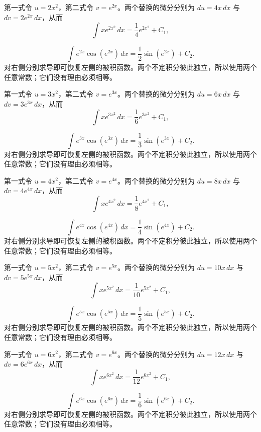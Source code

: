 \documentclass[UTF8,12pt,a4paper,fontset=fandol]{ctexart}
\begin{document}
\begin{solve}\label{ans:c12q14}
第一式令 $u=2x^2$，第二式令 $v=e^{2x}$。两个替换的微分分别为 $du=4x\,dx$ 与 $dv=2e^{2x}\,dx$，从而
\[
\int xe^{2x^2}\,dx=\frac{1}{4}e^{2x^2}+C_1,
\]

\[
\int e^{2x}\cos(e^{2x})\,dx=\frac{1}{2}\sin(e^{2x})+C_2.
\]
对右侧分别求导即可恢复左侧的被积函数。两个不定积分彼此独立，所以使用两个任意常数；它们没有理由必须相等。
\end{solve}

\begin{solve}\label{ans:c12q15}
第一式令 $u=3x^2$，第二式令 $v=e^{3x}$。两个替换的微分分别为 $du=6x\,dx$ 与 $dv=3e^{3x}\,dx$，从而
\[
\int xe^{3x^2}\,dx=\frac{1}{6}e^{3x^2}+C_1,
\]

\[
\int e^{3x}\cos(e^{3x})\,dx=\frac{1}{3}\sin(e^{3x})+C_2.
\]
对右侧分别求导即可恢复左侧的被积函数。两个不定积分彼此独立，所以使用两个任意常数；它们没有理由必须相等。
\end{solve}

\begin{solve}\label{ans:c12q16}
第一式令 $u=4x^2$，第二式令 $v=e^{4x}$。两个替换的微分分别为 $du=8x\,dx$ 与 $dv=4e^{4x}\,dx$，从而
\[
\int xe^{4x^2}\,dx=\frac{1}{8}e^{4x^2}+C_1,
\]

\[
\int e^{4x}\cos(e^{4x})\,dx=\frac{1}{4}\sin(e^{4x})+C_2.
\]
对右侧分别求导即可恢复左侧的被积函数。两个不定积分彼此独立，所以使用两个任意常数；它们没有理由必须相等。
\end{solve}

\begin{solve}\label{ans:c12q17}
第一式令 $u=5x^2$，第二式令 $v=e^{5x}$。两个替换的微分分别为 $du=10x\,dx$ 与 $dv=5e^{5x}\,dx$，从而
\[
\int xe^{5x^2}\,dx=\frac{1}{10}e^{5x^2}+C_1,
\]

\[
\int e^{5x}\cos(e^{5x})\,dx=\frac{1}{5}\sin(e^{5x})+C_2.
\]
对右侧分别求导即可恢复左侧的被积函数。两个不定积分彼此独立，所以使用两个任意常数；它们没有理由必须相等。
\end{solve}

\begin{solve}\label{ans:c12q18}
第一式令 $u=6x^2$，第二式令 $v=e^{6x}$。两个替换的微分分别为 $du=12x\,dx$ 与 $dv=6e^{6x}\,dx$，从而
\[
\int xe^{6x^2}\,dx=\frac{1}{12}e^{6x^2}+C_1,
\]

\[
\int e^{6x}\cos(e^{6x})\,dx=\frac{1}{6}\sin(e^{6x})+C_2.
\]
对右侧分别求导即可恢复左侧的被积函数。两个不定积分彼此独立，所以使用两个任意常数；它们没有理由必须相等。
\end{solve}
\end{document}
